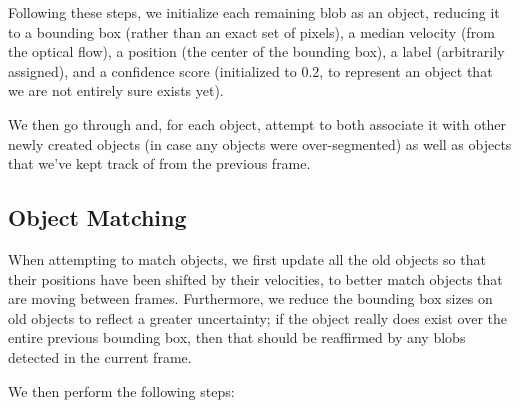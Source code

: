 \documentclass{article}
\begin{document}
Following these steps, we initialize each remaining blob as an object, reducing
it to a bounding box (rather than an exact set of pixels), a median velocity
(from the optical flow), a position (the center of the bounding box), a label
(arbitrarily assigned), and a confidence score (initialized to 0.2, to represent
an object that we are not entirely sure exists yet).

We then go through and, for each object, attempt to both associate it with other
newly created objects (in case any objects were over-segmented) as well as
objects that we've kept track of from the previous frame.

\subsection{Object Matching}

When attempting to match objects, we first update all the old objects so that
their positions have been shifted by their velocities, to better match objects
that are moving between frames. Furthermore, we reduce the bounding box sizes on
old objects to reflect a greater uncertainty; if the object really does exist
over the entire previous bounding box, then that should be reaffirmed by any
blobs detected in the current frame.

We then perform the following steps:
\end{document}

